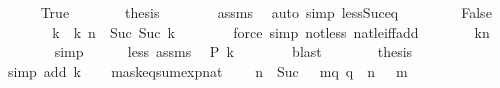 \begin{isabellebody}
\ \ \ \ \isamarkupfalse%
\ True\isanewline
\ \ \ \ \isamarkupfalse%
\ \isamarkupfalse%
\ {\isacharquery}{\kern0pt}thesis\isanewline
\ \ \ \ \ \ \isamarkupfalse%
\ assms\ \isamarkupfalse%
\ {\isacharparenleft}{\kern0pt}auto\ simp{\isacharcolon}{\kern0pt}\ less{\isacharunderscore}{\kern0pt}Suc{\isacharunderscore}{\kern0pt}eq{\isacharparenright}{\kern0pt}\isanewline
\ \ \isamarkupfalse%
\isanewline
\ \ \ \ \isamarkupfalse%
\ False\isanewline
\ \ \ \ \isamarkupfalse%
\ \isamarkupfalse%
\ k\ \ k{\isacharcolon}{\kern0pt}\ {\isachardoublequoteopen}n\ {\isacharequal}{\kern0pt}\ Suc\ {\isacharparenleft}{\kern0pt}Suc\ k{\isacharparenright}{\kern0pt}{\isachardoublequoteclose}\isanewline
\ \ \ \ \ \ \isamarkupfalse%
\ {\isacharparenleft}{\kern0pt}force\ simp{\isacharcolon}{\kern0pt}\ not{\isacharunderscore}{\kern0pt}less\ nat{\isacharunderscore}{\kern0pt}le{\isacharunderscore}{\kern0pt}iff{\isacharunderscore}{\kern0pt}add{\isacharparenright}{\kern0pt}\isanewline
\ \ \ \ \isamarkupfalse%
\ \isamarkupfalse%
\ {\isachardoublequoteopen}k{\isacharless}{\kern0pt}n{\isachardoublequoteclose}\isanewline
\ \ \ \ \ \ \isamarkupfalse%
\ simp\isanewline
\ \ \ \ \isamarkupfalse%
\ less\ assms\ \isamarkupfalse%
\ {\isachardoublequoteopen}P\ {\isacharparenleft}{\kern0pt}k{\isacharplus}{\kern0pt}{}{\isacharparenright}{\kern0pt}{\isachardoublequoteclose}\isanewline
\ \ \ \ \ \ \isamarkupfalse%
\ blast\isanewline
\ \ \ \ \isamarkupfalse%
\ \isamarkupfalse%
\ {\isacharquery}{\kern0pt}thesis\isanewline
\ \ \ \ \ \ \isamarkupfalse%
\ {\isacharparenleft}{\kern0pt}simp\ add{\isacharcolon}{\kern0pt}\ k{\isacharparenright}{\kern0pt}\isanewline
\ \ \isamarkupfalse%
\isanewline
{}\isamarkupfalse%
%
\endisatagproof
{\isafoldproof}%
%
\isadelimproof
\isanewline
%
\endisadelimproof
\isanewline
{}\isamarkupfalse%
\ mask{\isacharunderscore}{\kern0pt}eq{\isacharunderscore}{\kern0pt}sum{\isacharunderscore}{\kern0pt}exp{\isacharunderscore}{\kern0pt}nat{\isacharcolon}{\kern0pt}\isanewline
\ \ {\isacartoucheopen}{}\ {\isacharcircum}{\kern0pt}\ n\ {\isacharminus}{\kern0pt}\ Suc\ {}\ {\isacharequal}{\kern0pt}\ {\isacharparenleft}{\kern0pt}{\isasymSum}m{\isasymin}{\isacharbraceleft}{\kern0pt}q{\isachardot}{\kern0pt}\ q\ {\isacharless}{\kern0pt}\ n{\isacharbraceright}{\kern0pt}{\isachardot}{\kern0pt}\ {}\ {\isacharcircum}{\kern0pt}\ m{\isacharparenright}{\kern0pt}{\isacartoucheclose}\isanewline

\end{isabellebody}
